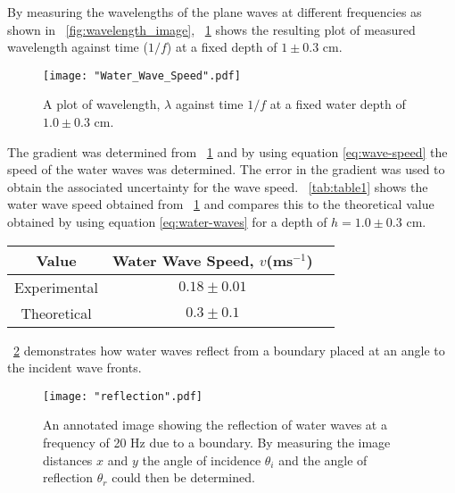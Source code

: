 \documentclass{article}
\newcommand{\figref}[2][\figurename~]{#1\ref{#2}}
\newcommand{\tabref}[2][\tablename~]{#1\ref{#2}}
\begin{document}
\vspace{2mm}
\noindent
By measuring the wavelengths of the plane waves at different frequencies as shown in \figref{fig:wavelength_image}, \figref{fig:speed_graph} shows the resulting plot of measured wavelength against time ($1/f$) at a fixed depth of $1 \pm 0.3$ cm. 

\begin{figure}[h]
\centering
\texttt{[image: "Water\_Wave\_Speed".pdf]}
\caption{A plot of wavelength, $\lambda$ against time $1/f$ at a fixed water depth of $1.0 \pm 0.3$ cm.}
\label{fig:speed_graph}
\end{figure}

\vspace{2mm}
\noindent
The gradient was determined from \figref{fig:speed_graph} and by using equation \eqref{eq:wave-speed} the speed of the water waves was determined. The error in the gradient was used to obtain the associated uncertainty for the wave speed. \tabref{tab:table1} shows the water wave speed obtained from \figref{fig:speed_graph} and compares this to the theoretical value obtained by using equation \eqref{eq:water-waves} for a depth of $h = 1.0 \pm 0.3$ cm.

\vspace{5mm}
\begin{table*}[h]
\centering %
\caption{Table of values for the speed of water waves at a fixed depth of $h = 1.0 \pm 0.3$ cm and varying frequency.}
\label{tab:table1}
\begin{tabular}{|c|c|c|}
\hline
Value & Water Wave Speed, $v$(ms$^{-1}$) \\
\hline
Experimental & $0.18 \pm 0.01$ \\
\hline
Theoretical & $0.3 \pm 0.1$ \\
\hline
\end{tabular}
\end{table*}

\vspace{2mm}
\noindent
\figref{fig:reflection_image} demonstrates how water waves reflect from a boundary placed at an angle to the incident wave fronts.

\begin{figure}[h]
\centering
\texttt{[image: "reflection".pdf]}
\caption{An annotated image showing the reflection of water waves at a frequency of 20 Hz due to a boundary. By measuring the image distances $x$ and $y$ the angle of incidence $\theta_i$ and the angle of reflection $\theta_r$ could then be determined.}
\label{fig:reflection_image}
\end{figure}
\end{document}
